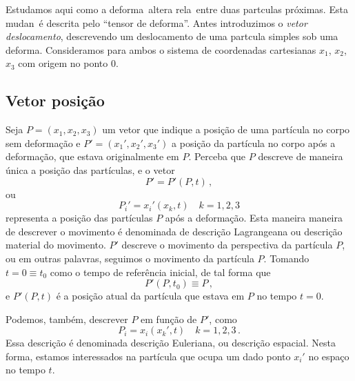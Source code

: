 Estudamos aqui como a deforma\cao\ altera rela\coes\ entre
duas part\ih culas pr\'oximas. Esta mudan\ca\
\'e descrita pelo ``tensor de deforma\cao''. Antes
introduzimos o {\it vetor deslocamento}, descrevendo um
deslocamento de uma part\ih cula simples sob uma
deforma\cao. Consideramos para ambos o sistema de
coordenadas cartesianas $x_1$, $x_2$, $x_3$ com origem no ponto 0.

\subsection{Vetor posi\c{c}\~ao}
Seja $P = (x_1,x_2,x_3)$ um vetor que indique a posi\c{c}\~ao de uma part\'icula
no corpo sem deforma\c{c}\~ao e $P'=(x_1',x_2',x_3')$ a posi\c{c}\~ao da
part\'icula no corpo ap\'os a deforma\c{c}\~ao, que estava originalmente em $P$. Perceba que $P$
descreve de maneira \'unica a posi\c{c}\~ao das part\'iculas, e o vetor
\begin{equation}
  P' = P'(P,t)\, ,
\end{equation}
ou
\begin{equation}
  P_i' = x_i'(x_k,t) \quad k=1,2,3 \label{eq:lagrangeana}
\end{equation}
representa a posi\c{c}\~ao das part\'iculas $P$ ap\'os a deforma\c{c}\~ao. 
Esta maneira maneira de descrever o movimento
\'e denominada de descri\c{c}\~ao Lagrangeana ou descri\c{c}\~ao material do
movimento. $P'$ descreve o movimento da perspectiva da part\'icula $P$, ou em outras palavras,
seguimos o movimento da part\'icula $P$.
Tomando $t = 0 \equiv t_0$ como o tempo de refer\^encia inicial, de tal forma
que
\begin{equation}
  P'(P,t_0) \equiv P \, ,
\end{equation}
e $P'(P,t)$ \'e a posi\c{c}\~ao atual da part\'icula que estava em $P$ no tempo
$t=0$.

Podemos, tamb\'em, descrever $P$ em fun\c{c}\~ao de $P'$, como
\begin{equation}
  P_i = x_i(x_k',t) \quad k=1,2,3\, . \label{eq:euleriana}
\end{equation}
Essa descri\c{c}\~ao \'e denominada descri\c{c}\~ao Euleriana, ou
descri\c{c}\~ao espacial. Nesta forma, estamos interessados na part\'icula que
ocupa um dado ponto $x_ i'$ no espa\c{c}o no tempo $t$.


